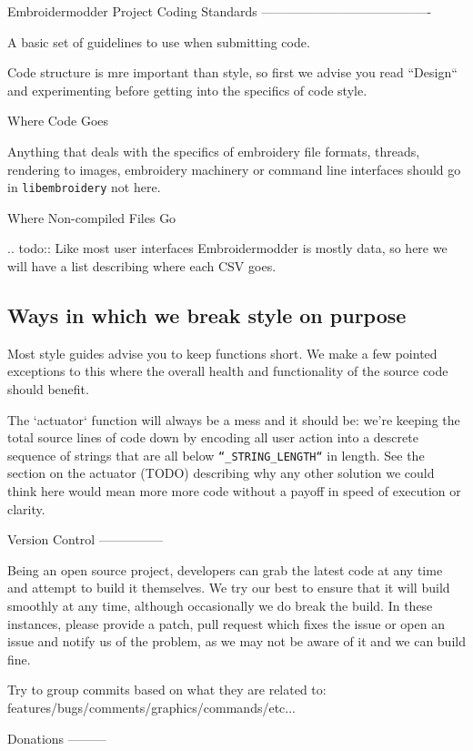 \documentclass[a4paper]{report}
\begin{document}
Embroidermodder Project Coding Standards
----------------------------------------

A basic set of guidelines to use when submitting code.

Code structure is mre important than style, so first we advise you read
``Design`` and experimenting before getting into the specifics of code style.

Where Code Goes
~~~~~~~~~~~~~~~

Anything that deals with the specifics of embroidery file formats, threads,
rendering to images, embroidery machinery or command line interfaces should go 
in \texttt{libembroidery} not here.

Where Non-compiled Files Go
~~~~~~~~~~~~~~~~~~~~~~~~~~~

.. todo::
   Like most user interfaces Embroidermodder is mostly data,
   so here we will have a list describing where each CSV goes.

\subsection{Ways in which we break style on purpose}

Most style guides advise you to keep functions short. We make a few pointed
exceptions to this where the overall health and functionality of the source code should benefit.

The `actuator` function will always be a mess and it should be: we're keeping
the total source lines of code down by encoding all user action into a descrete
sequence of strings that are all below \texttt{``\_STRING\_LENGTH``} in length. See
the section on the actuator (TODO) describing why any other solution we could
think  here would mean more more code without a payoff in speed of execution or
clarity.

Version Control
---------------

Being an open source project, developers can grab the latest code at any time and attempt to build it themselves. We try our best to ensure that it will build smoothly at any time, although occasionally we do break the build. In these instances, please provide a patch, pull request which fixes the issue or open an issue and notify us of the problem, as we may not be aware of it and we can build fine.

Try to group commits based on what they are related to: features/bugs/comments/graphics/commands/etc...

Donations
---------
\end{document}
